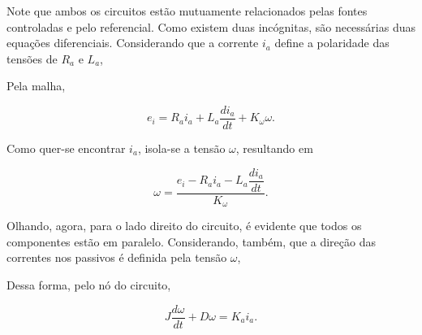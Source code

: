 \documentclass{article}
\numberwithin{equation}{section}
\let\dfr\dfrac
\begin{document}
\vspace{1cm}

\noindent Note que ambos os circuitos estão mutuamente relacionados pelas fontes controladas e pelo referencial. Como existem duas incógnitas, são necessárias duas equações diferenciais. Considerando que a corrente $i_a$ define a polaridade das tensões de $R_a$ e $L_a$,

\begin{center}
\end{center}

\noindent Pela malha,

\begin{equation*}
    e_i = R_a i_a + L_a \dfr{di_a}{dt} + K_{\omega}\omega.
\end{equation*}

\noindent Como quer-se encontrar $i_a$, isola-se a tensão $\omega$, resultando em

\begin{equation}
    \omega = \dfr{e_i - R_a i_a - L_a \dfr{di_a}{dt}}{K_{\omega}}. \label{eq:e2_velocidade_angular}
\end{equation}

\noindent Olhando, agora, para o lado direito do circuito, é evidente que todos os componentes estão em paralelo. Considerando, também, que a direção das correntes nos passivos é definida pela tensão $\omega$,

\begin{center}
\end{center}

\noindent Dessa forma, pelo nó do circuito,

\begin{equation}
    J \dfr{d\omega}{dt} + D \omega = K_a i_a. \label{eq:e2_edol_mista}
\end{equation}
\end{document}
